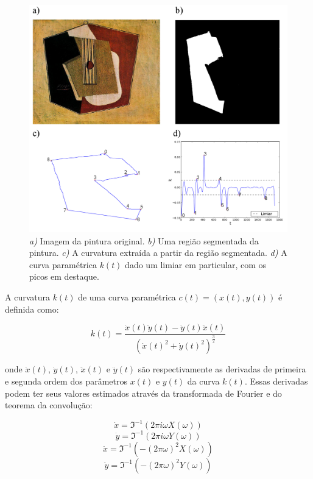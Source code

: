 \begin{figure}[h!]
\begin{center}
      \caption{\textit{a)} Imagem da pintura original. \textit{b)} Uma região
        segmentada da pintura. \textit{c)} A curvatura extraída a partir
        da região segmentada. \textit{d)} A curva paramétrica $k(t)$ dado um
        limiar em particular, com os picos em destaque.}
        \label{fig:curvatura}
        \includegraphics[width=\columnwidth]{figs/curvatura}
       \fonteminha
\end{center}
\end{figure}

A curvatura $k(t)$ de uma curva paramétrica $c(t) = (x(t), y(t))$ é definida como:

\begin{equation}
k(t) = \frac{\dot{x}(t)\ddot{y}(t)-\dot{y}(t)\ddot{x}(t)} {(\dot{x}(t)^2+\dot{y}(t)^2)^\frac{3}{2}}
\label{eq:curvatura}
\end{equation}

\noindent onde $\dot{x}(t)$, $\dot{y}(t)$, $\ddot{x}(t)$ e
$\ddot{y}(t)$ são respectivamente as derivadas de primeira e segunda
ordem dos parâmetros $x(t)$ e $y(t)$ da curva $k(t)$. Essas derivadas
podem ter seus valores estimados através da transformada de Fourier e
do teorema da convolução:~\cite{papoulis}

\begin{equation}
\dot{x} = \Im^{-1}(2\pi i \omega X(\omega))
\end{equation}
\begin{equation}
\dot{y} = \Im^{-1}(2\pi i \omega Y(\omega))
\end{equation}
\begin{equation}
\ddot{x} = \Im^{-1}(-(2\pi\omega)^2 X(\omega))
\end{equation}
\begin{equation}
\ddot{y} = \Im^{-1}(-(2\pi\omega)^2 Y(\omega))
\end{equation}

